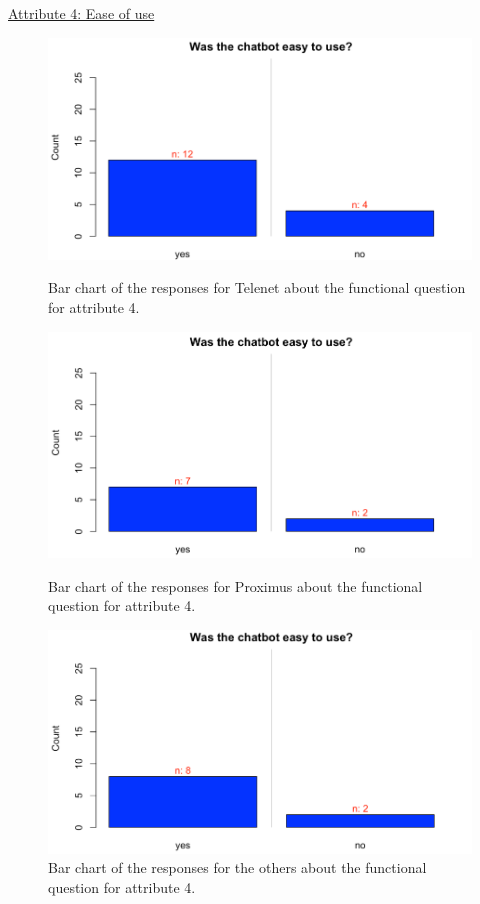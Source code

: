 \break 
\ul{Attribute 4: Ease of use}\\
\break
\begin{figure}[!htb]
	\includegraphics[width=\linewidth]{../LaTeX/Figures/Comparative/Q4T.png}
	\caption{Bar chart of the responses for Telenet about the functional question for attribute 4.}\label{fig:Q4T}
	\endminipage\hfill
	\includegraphics[width=\linewidth]{../LaTeX/Figures/Comparative/Q4P.png}
	\caption{Bar chart of the responses for Proximus about the functional question for attribute 4.}\label{fig:Q4P}
	\endminipage\hfill
	\includegraphics[width=\linewidth]{../LaTeX/Figures/Comparative/Q4O.png}
	\caption{Bar chart of the responses for the others about the functional question for attribute 4.}\label{fig:Q4O}
	\endminipage\hfill
\end{figure}
